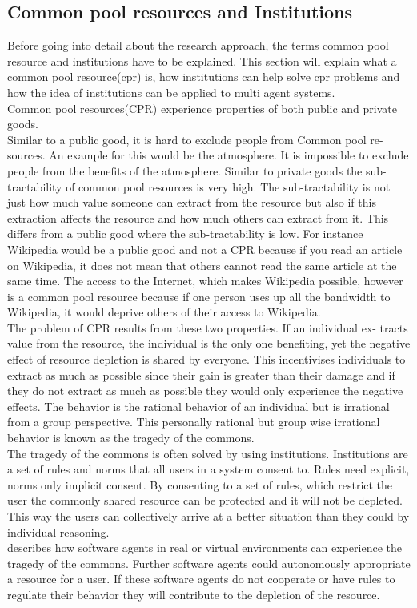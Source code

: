 \documentclass[a4paper]{article}
\begin{document}
\subsection{Common pool resources and Institutions}
Before going into detail about the research 
approach, the terms common pool resource and institutions have to be explained. 
This section will explain what a common pool resource(cpr) is, how institutions can help solve cpr problems and how the idea of institutions can be applied to multi agent systems. \\
Common pool resources(CPR) experience properties of both public and private
goods. \\
Similar to a public good, it is hard to exclude people from Common pool re-
sources. An example for this would be the atmosphere. It is impossible to
exclude people from the benefits of the atmosphere.
Similar to private goods the sub-tractability of common pool resources is very
high. The sub-tractability is not just how much value someone can extract from
the resource but also if this extraction affects the resource and how much others
can extract from it. This differs from a public good where the sub-tractability
is low. For instance Wikipedia would be a public good and not a CPR because
if you read an article on Wikipedia, it does not mean that others cannot read
the same article at the same time. The access to the Internet, which makes
Wikipedia possible, however is a common pool resource because if one person
uses up all the bandwidth to Wikipedia, it would deprive others of their access to
Wikipedia.\cite{cprbook}\\
The problem of CPR results from these two properties. If an individual ex-
tracts value from the resource, the individual is the only one benefiting, yet the
negative effect of resource depletion is shared by everyone. This incentivises
individuals to extract as much as possible since their gain is greater than their
damage and if they do not extract as much as possible they would only experience the negative effects. The behavior is the rational behavior of an individual
but is irrational from a group perspective. This personally rational but group
wise irrational behavior is known as the tragedy of the commons\cite{tragedy_book}.\\
The tragedy of the commons is often solved by using institutions. Institutions are  a set of rules and norms that all users in a 
system consent to. Rules need explicit, norms only implicit consent. By consenting to a set of rules, which restrict the user the 
commonly shared resource can be protected and it will not be depleted. This way the users can collectively arrive at a better situation 
than they could by individual reasoning\cite{institutions}. \\
\cite{ai_cpr} describes how software agents in real or virtual environments 
can experience the tragedy of the commons. Further software agents could autonomously appropriate
a resource for a user. If these software agents do not cooperate or have rules to regulate their behavior they will 
contribute to the depletion of the resource. 
\end{document}
